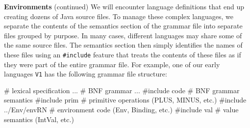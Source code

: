 \begin{minipage}[t]{\sw}
\slidenumber
\LARGE
{\bf Environments} (continued)\exx
We will encounter language definitions
that end up creating dozens of Java source files.
To manage these complex languages,
we separate the contents of the semantics section of the grammar file
into separate files grouped by purpose.
In many cases, different languages may share some of the same source files.
The semantics section then simply identifies the names of these files
using an \verb'#include' feature
that treats the contents of these files
as if they were part of the entire grammar file.\exx
For example, one of our early languages \verb'V1'
has the following grammar file structure:
{\Large
\begin{qv}
# lexical specification
...
%
# BNF grammar
...
%
#include code            # BNF grammar semantics
#include prim            # primitive operations (PLUS, MINUS, etc.)
#include ../Env/envRN    # environment code (Env, Binding, etc.)
#include val             # value semantics (IntVal, etc.)
\end{qv}
}
\end{minipage}
\clearpage
